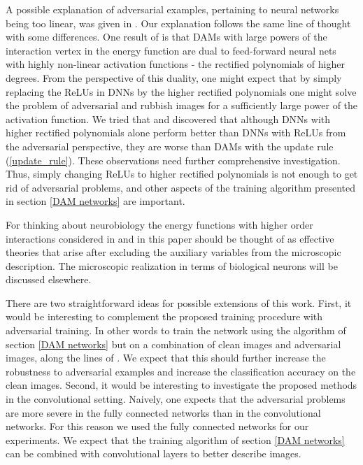 \documentclass[12pt]{article} %
\begin{document}
A possible explanation of adversarial examples, pertaining to neural networks being too linear, was given in \cite{sign gradient}. Our explanation follows the same line of thought with some differences. One result of \cite{Krotov Hopfield} is that DAMs with large powers of the interaction vertex in the energy function are dual to feed-forward neural nets with highly non-linear activation functions - the rectified polynomials of higher degrees. From the perspective of this duality, one might expect that by simply replacing the ReLUs in DNNs by the higher rectified polynomials one might solve the problem of adversarial and rubbish images for a sufficiently large power of the activation function. We tried that and discovered that although DNNs with higher rectified polynomials alone perform better than DNNs with ReLUs from the adversarial perspective, they are worse than DAMs with the update rule (\ref{update_rule}). These observations need further comprehensive investigation. Thus, simply changing ReLUs to higher rectified polynomials is not enough to get rid of adversarial problems, and other aspects of the training algorithm presented in section \ref{DAM networks} are important. 

For thinking about neurobiology the energy functions with higher order interactions considered in \cite{Krotov Hopfield} and in this paper should be thought of as effective theories that arise after excluding the auxiliary variables from the microscopic description. The microscopic realization in terms of biological neurons will be discussed elsewhere. 

There are two straightforward ideas for possible extensions of this work. First, it would be interesting to complement the proposed training procedure with adversarial training. In other words to train the network using the algorithm of section \ref{DAM networks} but on a combination of clean images and adversarial images, along the lines of \cite{Nokland,sign gradient}.  We expect that this should further increase the robustness to adversarial examples and increase the classification accuracy on the clean images. Second, it would be interesting to investigate the proposed methods in the convolutional setting. Naively, one expects that the adversarial problems are more severe in the fully connected networks than in the convolutional networks. For this reason we used the fully connected networks for our experiments. We expect that the training algorithm of section \ref{DAM networks} can be combined with convolutional layers to better describe images.  
\end{document}
